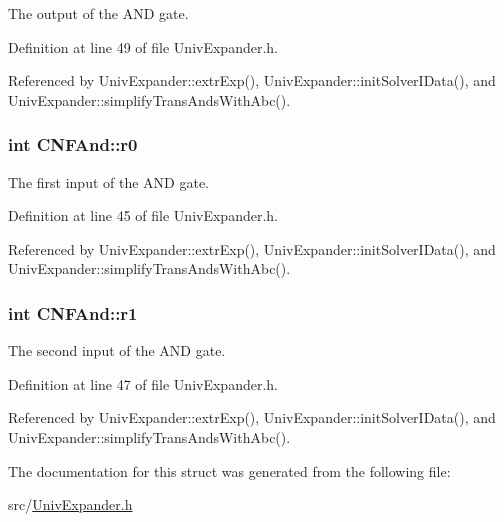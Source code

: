 The output of the A\-N\-D gate. 



Definition at line 49 of file Univ\-Expander.\-h.



Referenced by Univ\-Expander\-::extr\-Exp(), Univ\-Expander\-::init\-Solver\-I\-Data(), and Univ\-Expander\-::simplify\-Trans\-Ands\-With\-Abc().

\hypertarget{structCNFAnd_af6bc1f99380599a333189ee6d0880f35}{
\subsubsection[{r0}]{\setlength{\rightskip}{0pt plus 5cm}int C\-N\-F\-And\-::r0}}\label{structCNFAnd_af6bc1f99380599a333189ee6d0880f35}


The first input of the A\-N\-D gate. 



Definition at line 45 of file Univ\-Expander.\-h.



Referenced by Univ\-Expander\-::extr\-Exp(), Univ\-Expander\-::init\-Solver\-I\-Data(), and Univ\-Expander\-::simplify\-Trans\-Ands\-With\-Abc().

\hypertarget{structCNFAnd_a5d3ba7f5d9083fb928df7bad947a6fc9}{
\subsubsection[{r1}]{\setlength{\rightskip}{0pt plus 5cm}int C\-N\-F\-And\-::r1}}\label{structCNFAnd_a5d3ba7f5d9083fb928df7bad947a6fc9}


The second input of the A\-N\-D gate. 



Definition at line 47 of file Univ\-Expander.\-h.



Referenced by Univ\-Expander\-::extr\-Exp(), Univ\-Expander\-::init\-Solver\-I\-Data(), and Univ\-Expander\-::simplify\-Trans\-Ands\-With\-Abc().



The documentation for this struct was generated from the following file\-:\begin{DoxyCompactItemize}
\item 
src/\hyperlink{UnivExpander_8h}{Univ\-Expander.\-h}\end{DoxyCompactItemize}
